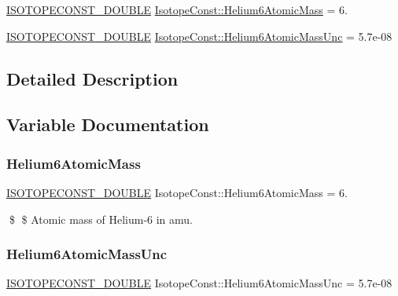 \begin{DoxyCompactItemize}
\item 
\mbox{\hyperlink{group___isotope_const-_macros_ga8f45a7272ce02c0b4c65c44636ed719a}{I\+S\+O\+T\+O\+P\+E\+C\+O\+N\+S\+T\+\_\+\+D\+O\+U\+B\+LE}} \mbox{\hyperlink{group___isotope_const-_helium-_he6_ga37a6f40ca86377bc0780c8474c3befe1}{Isotope\+Const\+::\+Helium6\+Atomic\+Mass}} = 6.
\item 
\mbox{\hyperlink{group___isotope_const-_macros_ga8f45a7272ce02c0b4c65c44636ed719a}{I\+S\+O\+T\+O\+P\+E\+C\+O\+N\+S\+T\+\_\+\+D\+O\+U\+B\+LE}} \mbox{\hyperlink{group___isotope_const-_helium-_he6_ga38c424bac03bf20656cdcaaba898f4b6}{Isotope\+Const\+::\+Helium6\+Atomic\+Mass\+Unc}} = 5.\+7e-\/08
\end{DoxyCompactItemize}


\subsection{Detailed Description}


\subsection{Variable Documentation}
\mbox{\label{group___isotope_const-_helium-_he6_ga37a6f40ca86377bc0780c8474c3befe1}} 
\subsubsection{\texorpdfstring{Helium6\+Atomic\+Mass}{Helium6AtomicMass}}
{\footnotesize\ttfamily \mbox{\hyperlink{group___isotope_const-_macros_ga8f45a7272ce02c0b4c65c44636ed719a}{I\+S\+O\+T\+O\+P\+E\+C\+O\+N\+S\+T\+\_\+\+D\+O\+U\+B\+LE}} Isotope\+Const\+::\+Helium6\+Atomic\+Mass = 6.}

\$ \$ Atomic mass of Helium-\/6 in amu. \mbox{\label{group___isotope_const-_helium-_he6_ga38c424bac03bf20656cdcaaba898f4b6}} 
\subsubsection{\texorpdfstring{Helium6\+Atomic\+Mass\+Unc}{Helium6AtomicMassUnc}}
{\footnotesize\ttfamily \mbox{\hyperlink{group___isotope_const-_macros_ga8f45a7272ce02c0b4c65c44636ed719a}{I\+S\+O\+T\+O\+P\+E\+C\+O\+N\+S\+T\+\_\+\+D\+O\+U\+B\+LE}} Isotope\+Const\+::\+Helium6\+Atomic\+Mass\+Unc = 5.\+7e-\/08}

